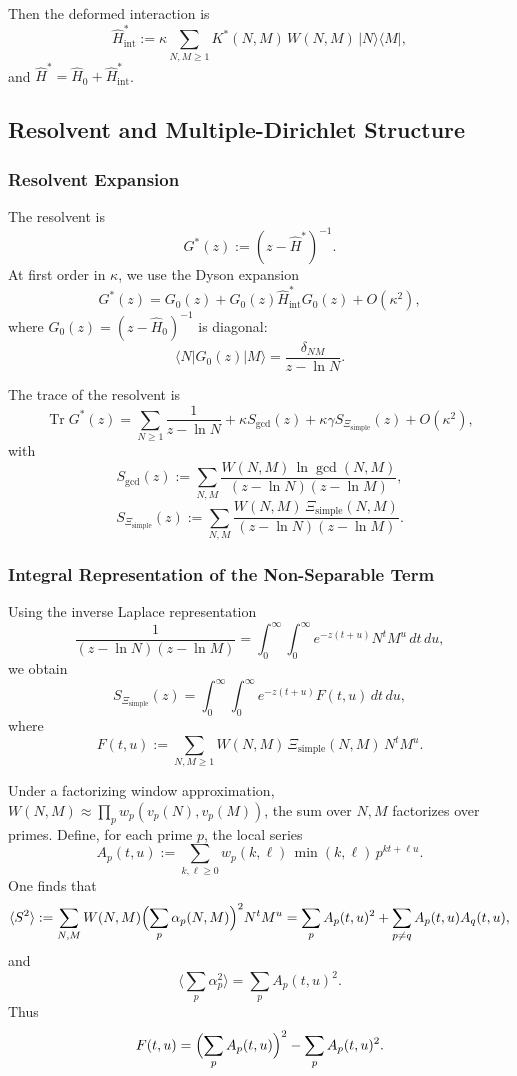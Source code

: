 \documentclass[11pt]{article}
\begin{document}
Then the deformed interaction is
\[
  \hat{H}_{\text{int}}^*
    := \kappa \sum_{N,M\ge 1}
       K^*(N,M)\,W(N,M)\,|N\rangle\langle M|,
\]
and $\hat{H}^* = \hat{H}_0 + \hat{H}_{\text{int}}^*$.

\subsection{Resolvent and Multiple-Dirichlet Structure}

\subsubsection{Resolvent Expansion}

The resolvent is
\[
  G^*(z) := (z - \hat{H}^*)^{-1}.
\]
At first order in $\kappa$, we use the Dyson expansion
\[
  G^*(z)
    = G_0(z) + G_0(z)\hat{H}_{\text{int}}^* G_0(z) + O(\kappa^2),
\]
where $G_0(z) = (z - \hat{H}_0)^{-1}$ is diagonal:
\[
  \langle N|G_0(z)|M\rangle = \frac{\delta_{NM}}{z - \ln N}.
\]

The trace of the resolvent is
\[
  \operatorname{Tr} G^*(z)
    = \sum_{N\ge 1} \frac{1}{z - \ln N}
      + \kappa S_{\gcd}(z)
      + \kappa\gamma S_{\Xi_{\text{simple}}}(z)
      + O(\kappa^2),
\]
with
\[
  S_{\gcd}(z)
    := \sum_{N,M} \frac{W(N,M)\,\ln\gcd(N,M)}{(z-\ln N)(z-\ln M)},
\]
\[
  S_{\Xi_{\text{simple}}}(z)
    := \sum_{N,M}
       \frac{W(N,M)\,\Xi_{\text{simple}}(N,M)}{(z-\ln N)(z-\ln M)}.
\]

\subsubsection{Integral Representation of the Non-Separable Term}

Using the inverse Laplace representation
\[
  \frac{1}{(z-\ln N)(z-\ln M)}
    = \int_0^\infty\!\!\int_0^\infty
      e^{-z(t+u)} N^t M^u\,dt\,du,
\]
we obtain
\[
  S_{\Xi_{\text{simple}}}(z)
    = \int_0^\infty\!\!\int_0^\infty
      e^{-z(t+u)} F(t,u)\,dt\,du,
\]
where
\[
  F(t,u)
    := \sum_{N,M\ge 1} W(N,M)\,\Xi_{\text{simple}}(N,M)\,N^t M^u.
\]

Under a factorizing window approximation,
$W(N,M) \approx \prod_p w_p(v_p(N),v_p(M))$, the sum over $N,M$
factorizes over primes. Define, for each prime $p$, the local series
\[
  A_p(t,u)
    := \sum_{k,\ell\ge 0}
       w_p(k,\ell)\,\min(k,\ell)\,p^{kt+\ell u}.
\]
One finds that
\[
  \langle S^2 \rangle
    := \sum_{N,M} W(N,M)
       \Bigl(\sum_p \alpha_p(N,M)\Bigr)^2 N^t M^u
    = \sum_p A_p(t,u)^2
      + \sum_{p\ne q} A_p(t,u) A_q(t,u),
\]
and
\[
  \langle \sum_p \alpha_p^2 \rangle
    = \sum_p A_p(t,u)^2.
\]
Thus
\[
  F(t,u)
    = \Bigl(\sum_p A_p(t,u)\Bigr)^2 - \sum_p A_p(t,u)^2.
\]
\end{document}
